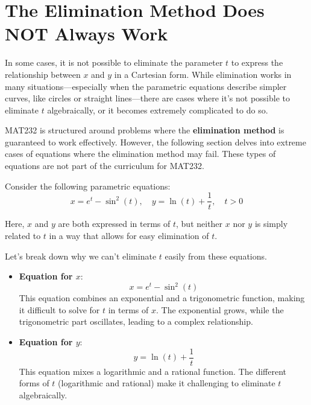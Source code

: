\documentclass{article}
\begin{document}
\section*{The Elimination Method Does NOT Always Work}
\begin{warningbox}
    In some cases, it is not possible to eliminate the parameter \( t \) to express the relationship between \( x \) and \( y \) in a Cartesian form. While elimination works in many situations—especially when the parametric equations describe simpler curves, like circles or straight lines—there are cases where it's not possible to eliminate \( t \) algebraically, or it becomes extremely complicated to do so.

    \begin{remarkbox}
        MAT232 is structured around problems where the \textbf{elimination method} is guaranteed to work effectively. However, the following section delves into extreme cases of equations where the elimination method may fail. These types of equations are not part of the curriculum for MAT232.
    \end{remarkbox}
    
    \begin{examplebox}
        Consider the following parametric equations:
        \[
        x = e^t - \sin^2(t), \quad y = \ln(t) + \frac{1}{t}, \quad t > 0
        \]
        
        Here, \( x \) and \( y \) are both expressed in terms of \( t \), but neither \( x \) nor \( y \) is simply related to \( t \) in a way that allows for easy elimination of \( t \).
        
        \begin{intuitionbox}
        Let's break down why we can't eliminate \( t \) easily from these equations.
        
        \begin{itemize}
            \item \textbf{Equation for \( x \)}: 
            \[
            x = e^t - \sin^2(t)
            \]
            This equation combines an exponential and a trigonometric function, making it difficult to solve for \( t \) in terms of \( x \). The exponential grows, while the trigonometric part oscillates, leading to a complex relationship.
        
            \item \textbf{Equation for \( y \)}:
            \[
            y = \ln(t) + \frac{1}{t}
            \]
            This equation mixes a logarithmic and a rational function. The different forms of \( t \) (logarithmic and rational) make it challenging to eliminate \( t \) algebraically.
        \end{itemize}        
        \end{intuitionbox}
    \end{examplebox}
\end{warningbox}
\end{document}
